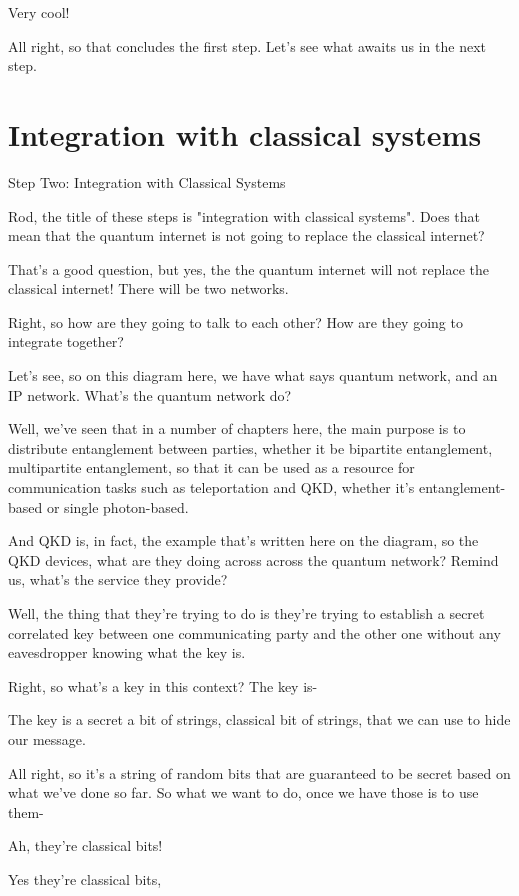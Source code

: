 Very cool!

All right, so that concludes the first step. Let's see what awaits us in the next step.

\section{Integration with classical systems}
\label{sec:classical-integration}

Step Two: Integration with Classical Systems

Rod, the title of these steps is "integration with classical systems". Does that mean that the quantum internet is not going to replace the classical internet?

That's a good question, but yes, the the quantum internet will not replace the classical internet! There will be two networks.

Right, so how are they going to talk to each other? How are they going to integrate together?

Let's see, so on this diagram here, we have what says quantum network, and an IP network. What's the quantum network do?

Well, we've seen that in a number of chapters here, the main purpose is to distribute entanglement between parties, whether it be bipartite entanglement, multipartite entanglement, so that it can be used as a resource for communication tasks such as teleportation and QKD, whether it's entanglement-based or single photon-based.

And QKD is, in fact, the example that's written here on the diagram, so the QKD devices, what are they doing across across the quantum network? Remind us, what's the service they provide?

Well, the thing that they're trying to do is they're trying to establish a secret correlated key between one communicating party and the other one without any eavesdropper knowing what the key is.

Right, so what's a key in this context? The key is-

The key is a secret a bit of strings, classical bit of strings, that we can use to hide our message.

All right, so it's a string of random bits that are guaranteed to be secret based on what we've done so far. So what we want to do, once we have those is to use them-

Ah, they're classical bits!

Yes they're classical bits,

